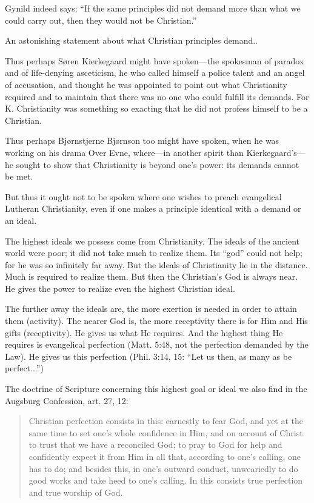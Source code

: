 Gynild indeed says: “If the same principles did not demand more than what we could carry out, then they would not be Christian.”

An astonishing statement about what Christian principles demand..

Thus perhaps Søren Kierkegaard might have spoken—the spokesman of paradox and of life-denying asceticism, he who called himself a police talent and an angel of accusation, and thought he was appointed to point out what Christianity required and to maintain that there was no one who could fulfill its demands. For K. Christianity was something so exacting that he did not profess himself to be a Christian.

Thus perhaps Bjørnstjerne Bjørnson too might have spoken, when he was working on his drama Over Evne, where—in another spirit than Kierkegaard’s—he sought to show that Christianity is beyond one’s power: its demands cannot be met.

But thus it ought not to be spoken where one wishes to preach evangelical Lutheran Christianity, even if one makes a principle identical with a demand or an ideal.

The highest ideals we possess come from Christianity. The ideals of the ancient world were poor; it did not take much to realize them. Its “god” could not help; for he was so infinitely far away. But the ideals of Christianity lie in the distance. Much is required to realize them. But then the Christian’s God is always near. He gives the power to realize even the highest Christian ideal.

The further away the ideals are, the more exertion is needed in order to attain them (activity). The nearer God is, the more receptivity there is for Him and His gifts (receptivity). He gives us what He requires. And the highest thing He requires is evangelical perfection (Matt. 5:48, not the perfection demanded by the Law). He gives us this perfection (Phil. 3:14, 15: “Let us then, as many as be perfect...”)

The doctrine of Scripture concerning this highest goal or ideal we also find in the Augsburg Confession, art. 27, 12:

\begin{quote}
Christian perfection consists in this: earnestly to fear God, and yet at the same time to set one’s whole confidence in Him, and on account of Christ to trust that we have a reconciled God; to pray to God for help and confidently expect it from Him in all that, according to one’s calling, one has to do; and besides this, in one’s outward conduct, unweariedly to do good works and take heed to one’s calling. In this consists true perfection and true worship of God.
\end{quote}

